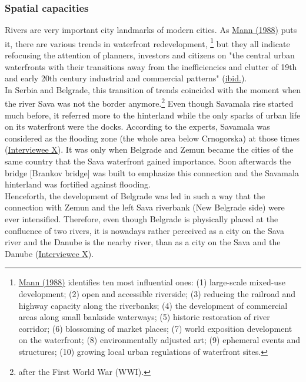 \documentclass[11pt]{report}
\begin{document}
\subsubsection{Spatial capacities}

Rivers are very important city landmarks of modern cities. %
As \href{Mann1988}{Mann (1988)} puts it, there are various trends in waterfront redevelopment,
\footnote{\href{Mann1988}{Mann (1988)} identifies ten most influential ones:
(1) large-scale mixed-use development;
(2) open and accessible riverside;
(3) reducing the railroad and highway capacity along the riverbanks;
(4) the development of commercial areas along small bankside waterways; 
(5) historic restoration of river corridor;
(6) blossoming of market places;
(7) world exposition development on the waterfront;
(8) environmentally adjusted art;
(9) ephemeral events and structures;
(10) growing local urban regulations of waterfront sites.}
but they all indicate refocusing the attention of planners, investors and citizens on "the central urban waterfronts with their transitions away from the inefficiencies and clutter of 19th and early 20th century industrial and commercial patterns" (\href{Mann1988}{ibid.}).
\\

In Serbia and Belgrade, this transition of trends coincided with the moment when the river Sava was not the border anymore.\footnote{after the First World War (WWI).}
Even though Savamala rise started much before, it referred more to the hinterland while the only sparks of urban life on its waterfront were the docks.
According to the experts, Savamala was considered as the flooding zone (the whole area below Crnogorska) at those times (\href{InterviewX}{Interviewee X}).
It was only when Belgrade and Zemun became the cities of the same country that the Sava waterfront gained importance. Soon afterwards the bridge [Brankov bridge] was built to emphasize this connection and the Savamala hinterland was fortified against flooding.
\\

Henceforth, the development of Belgrade was led in such a way that the connection with Zemun and the left Sava riverbank (New Belgrade side) were ever intensified.
Therefore, even though Belgrade is physically placed at the confluence of two rivers, it is nowadays rather perceived as a city on the Sava river and the Danube is the nearby river, than as a city on the Sava and the Danube (\href{InterviewX}{Interviewee X}).
\\
\end{document}
